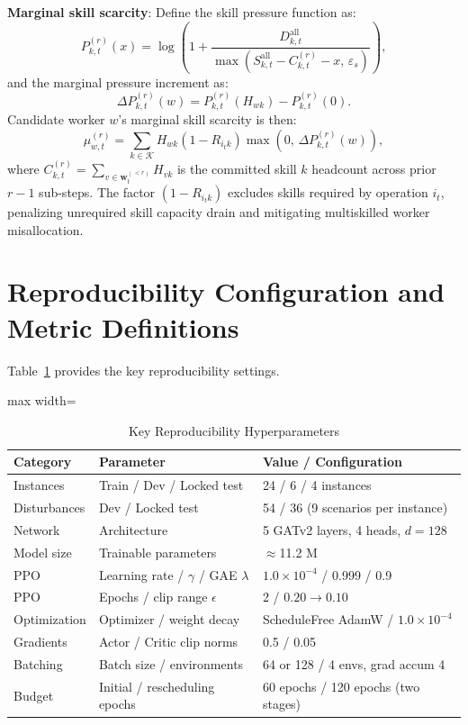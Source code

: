 \documentclass[journal,10pt]{IEEEtran}
\renewcommand{\arraystretch}{0.98}
\begin{document}
\textbf{Marginal skill scarcity}:
Define the skill pressure function as:
\begin{equation}
P_{k,t}^{(r)}(x) = \log\!\left( 1+ \frac{D_{k,t}^{\mathrm{all}}} {\max\!\left( S_{k,t}^{\mathrm{all}}-C_{k,t}^{(r)}-x,\, \varepsilon_s \right)} \right),
\end{equation}
and the marginal pressure increment as:
\begin{equation}
\Delta P_{k,t}^{(r)}(w) = P_{k,t}^{(r)}(H_{wk}) - P_{k,t}^{(r)}(0).
\end{equation}
Candidate worker $w$'s marginal skill scarcity is then:
\begin{equation}
\mu_{w,t}^{(r)} = \sum_{k\in\mathcal K} H_{wk}(1-R_{i_tk}) \max\!\left( 0,\, \Delta P_{k,t}^{(r)}(w) \right),
\end{equation}
where $C_{k,t}^{(r)} = \sum_{v\in\mathbf w_t^{(<r)}} H_{vk}$ is the committed skill $k$ headcount across prior $r-1$ sub-steps. The factor $(1-R_{i_tk})$ excludes skills required by operation $i_t$, penalizing unrequired skill capacity drain and mitigating multiskilled worker misallocation.

\section{Reproducibility Configuration and Metric Definitions}\label{app:reproducibility}

Table~\ref{tab:reproducibility} provides the key reproducibility settings.

\begin{table}[!t]
\centering
\caption{Key Reproducibility Hyperparameters}
\label{tab:reproducibility}
\setlength{\tabcolsep}{2.5pt}
\renewcommand{\arraystretch}{0.92}
\begin{adjustbox}{max width=\columnwidth}
\begin{tabular}{@{}llp{4.2cm}@{}}
\toprule
\textbf{Category} & \textbf{Parameter} & \textbf{Value / Configuration} \\
\midrule
Instances & Train / Dev / Locked test & 24 / 6 / 4 instances \\
Disturbances & Dev / Locked test & 54 / 36 (9 scenarios per instance) \\
Network & Architecture & 5 GATv2 layers, 4 heads, $d=128$ \\
Model size & Trainable parameters & $\approx$11.2 M \\
PPO & Learning rate / $\gamma$ / GAE $\lambda$ & $1.0\times10^{-4}$ / 0.999 / 0.9 \\
PPO & Epochs / clip range $\epsilon$ & 2 / $0.20\to0.10$ \\
Optimization & Optimizer / weight decay & ScheduleFree AdamW / $1.0\times10^{-4}$ \\
Gradients & Actor / Critic clip norms & 0.5 / 0.05 \\
Batching & Batch size / environments & 64 or 128 / 4 envs, grad accum 4 \\
Budget & Initial / rescheduling epochs & 60 epochs / 120 epochs (two stages) \\
\bottomrule
\end{tabular}
\end{adjustbox}
\end{table}
\end{document}
